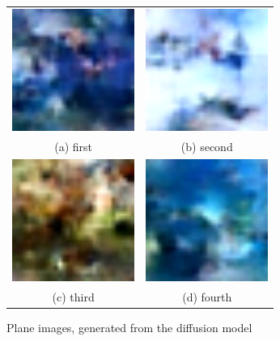 \documentclass[conference]{IEEEtran}
\begin{document}
\begin{figure}
  \begin{tabular}{cc}
    \includegraphics[width=40mm]{./images/generated-imgs-cosine/plane/0000.png} 
&   \includegraphics[width=40mm]{./images/generated-imgs-cosine/plane/0001.png} 
\\
  (a) first 
  & (b) second \\[6pt]
      \includegraphics[width=40mm]{./images/generated-imgs-cosine/plane/0002.png} 
  &  \includegraphics[width=40mm]{./images/generated-imgs-cosine/plane/0003.png} 
\\
  (c) third & (d) fourth \\[6pt]
  \end{tabular}
  \caption{Plane images, generated from the diffusion model}
\end{figure}

\end{document}
